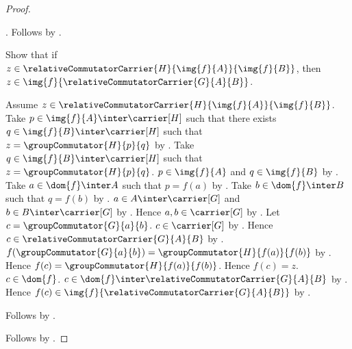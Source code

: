 \begin{proof}
\begin{subproof}
\begin{subproof}
                .
            Follows by .
        \end{subproof}
        Show that if
            $z\in\relativeCommutatorCarrier{H}{\img{f}{A}}{\img{f}{B}}$,
            then $z\in\img{f}{\relativeCommutatorCarrier{G}{A}{B}}$.
        \begin{subproof}
            Assume
                $z\in\relativeCommutatorCarrier{H}{\img{f}{A}}{\img{f}{B}}$.
            Take $p\in\img{f}{A}\inter\carrier[H]$ such that there exists
                $q\in\img{f}{B}\inter\carrier[H]$ such that
                $z=\groupCommutator{H}{p}{q}$ by
                .
            Take $q\in\img{f}{B}\inter\carrier[H]$ such that
                $z=\groupCommutator{H}{p}{q}$.
            $p\in\img{f}{A}$ and $q\in\img{f}{B}$ by
                .
            Take $a\in\dom{f}\inter A$ such that $p=f(a)$ by
                .
            Take $b\in\dom{f}\inter B$ such that $q=f(b)$ by
                .
            $a\in A\inter\carrier[G]$ and
                $b\in B\inter\carrier[G]$ by
                .
            Hence $a,b\in\carrier[G]$ by .
            Let $c=\groupCommutator{G}{a}{b}$.
            $c\in\carrier[G]$ by .
            Hence $c\in\relativeCommutatorCarrier{G}{A}{B}$ by
                .
            $f(\groupCommutator{G}{a}{b})=
                \groupCommutator{H}{f(a)}{f(b)}$ by
                .
            Hence $f(c)=\groupCommutator{H}{f(a)}{f(b)}$.
            Hence $f(c)=z$.
            $c\in\dom{f}$.
            $c\in\dom{f}\inter\relativeCommutatorCarrier{G}{A}{B}$ by
                .
            Hence
                $f(c)\in\img{f}{\relativeCommutatorCarrier{G}{A}{B}}$ by
                .
        \end{subproof}
        Follows by \auto.
    \end{subproof}
    Follows by .
\end{proof}

